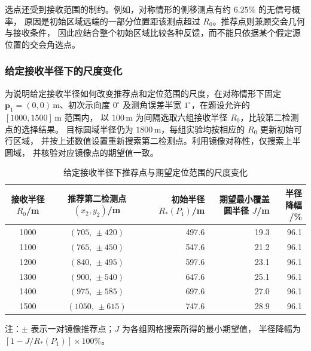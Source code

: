 \documentclass[UTF8,a4paper,12pt]{ctexart}
\begin{document}
选点还受到接收范围的制约。例如，对称情形的侧移测点有约 $6.25\%$ 的无信号概率，
原因是初始区域远端的一部分位置距该测点超过 $R_0$。推荐点则兼顾交会几何与接收条件，
因此应结合整个初始区域比较各种反馈，而不能只依据某个假定源位置的交会角选点。
\FloatBarrier


\subsubsection{给定接收半径下的尺度变化}
\label{sec:q2-scale}

为说明给定接收半径如何改变推荐点和定位范围的尺度，在对称情形下固定
$\boldsymbol p_1=(0,0)\,\mathrm m$、初次示向度 $0^\circ$
及测角误差半宽 $1^\circ$，在题设允许的 $[1000,1500]\,\mathrm m$ 范围内，
以 $100\,\mathrm m$ 为间隔选取六组接收半径 $R_0$，比较第二检测点的选择结果。
目标圆域半径仍为 $1800\,\mathrm m$，每组实验均按相应的 $R_0$ 更新初始可行区域，
并按上述数值设置重新搜索第二检测点。利用镜像对称性，仅搜索上半圆域，
并核验对应镜像点的期望值一致。

\begin{table}[htbp]
  \centering
  \caption{给定接收半径下推荐点与期望定位范围的尺度变化}
  \label{tab:q2-r0}
  \small
  \setlength{\tabcolsep}{7pt}
  \renewcommand{\arraystretch}{1.25}
  \begin{tabular}{ccrrr}
    \toprule
    \shortstack{接收半径\\$R_0$/m} &
    \shortstack{推荐第二检测点\\$(x_2,y_2)$/m} &
    \shortstack{初始半径\\$R_*(P_1)$/m} &
    \shortstack{期望最小覆盖\\圆半径 $J$/m} &
    \shortstack{半径降幅\\/\%} \\
    \midrule
    1000 & $(705,\,\pm 420)$ & 497.6 & 19.3 & 96.1 \\
    1100 & $(765,\,\pm 450)$ & 547.6 & 21.2 & 96.1 \\
    1200 & $(840,\,\pm 495)$ & 597.6 & 23.1 & 96.1 \\
    1300 & $(900,\,\pm 540)$ & 647.6 & 25.1 & 96.1 \\
    1400 & $(975,\,\pm 585)$ & 697.6 & 27.0 & 96.1 \\
    1500 & $(1050,\,\pm 615)$ & 747.6 & 28.9 & 96.1 \\
    \bottomrule
  \end{tabular}
  \par\smallskip
  \parbox{0.94\linewidth}{\footnotesize 注：$\pm$ 表示一对镜像推荐点；$J$ 为各组网格搜索所得的最小期望值，
  半径降幅为 $[1-J/R_*(P_1)]\times100\%$。}
\end{table}
\end{document}
